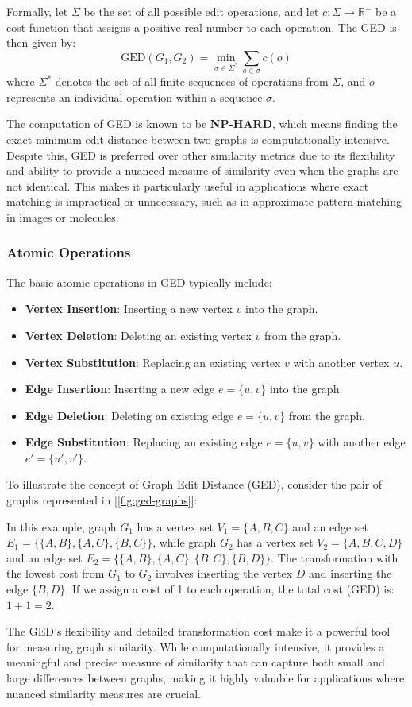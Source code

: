 \documentclass[../Thesis.tex]{subfiles}
\begin{document}
	Formally, let $\Sigma$ be the set of all possible edit operations, and let $c: \Sigma \to \mathbb{R}^+$ be a cost function that assigns a positive real number to each operation. The GED is then given by:
	\[
	\text{GED}(G_1, G_2) = \min_{\sigma \in \Sigma^*} \sum_{o \in \sigma} c(o)
	\]
	where $\Sigma^*$ denotes the set of all finite sequences of operations from $\Sigma$, and $o$ represents an individual operation within a sequence $\sigma$.
	
	The computation of GED is known to be \textbf{NP-HARD}, which means finding the exact minimum edit distance between two graphs is computationally intensive. Despite this, GED is preferred over other similarity metrics due to its flexibility and ability to provide a nuanced measure of similarity even when the graphs are not identical. This makes it particularly useful in applications where exact matching is impractical or unnecessary, such as in approximate pattern matching in images or molecules.
	
	\subsubsection{Atomic Operations}
	
	The basic atomic operations in GED typically include:
	
	\begin{itemize}
		\item \textbf{Vertex Insertion}: Inserting a new vertex $v$ into the graph.
		\item \textbf{Vertex Deletion}: Deleting an existing vertex $v$ from the graph.
		\item \textbf{Vertex Substitution}: Replacing an existing vertex $v$ with another vertex $u$.
		\item \textbf{Edge Insertion}: Inserting a new edge $e = \{u, v\}$ into the graph.
		\item \textbf{Edge Deletion}: Deleting an existing edge $e = \{u, v\}$ from the graph.
		\item \textbf{Edge Substitution}: Replacing an existing edge $e = \{u, v\}$ with another edge $e' = \{u', v'\}$.
	\end{itemize}
	
	To illustrate the concept of Graph Edit Distance (GED), consider the pair of graphs represented in [\autoref{fig:ged-graphs}]:
	
	In this example, graph $G_1$ has a vertex set $V_1 = \{A, B, C\}$ and an edge set $E_1 = \{\{A, B\}, \{A, C\}, \{B, C\}\}$, while graph $G_2$ has a vertex set $V_2 = \{A, B, C, D\}$ and an edge set $E_2 = \{\{A, B\}, \{A, C\}, \{B, C\}, \{B, D\}\}$. The transformation with the lowest cost from $G_1$ to $G_2$ involves inserting the vertex $D$ and inserting the edge $\{B, D\}$. If we assign a cost of 1 to each operation, the total cost (GED) is: $1+1=2$.
	
	The GED's flexibility and detailed transformation cost make it a powerful tool for measuring graph similarity. While computationally intensive, it provides a meaningful and precise measure of similarity that can capture both small and large differences between graphs, making it highly valuable for applications where nuanced similarity measures are crucial.
	
\end{document}
